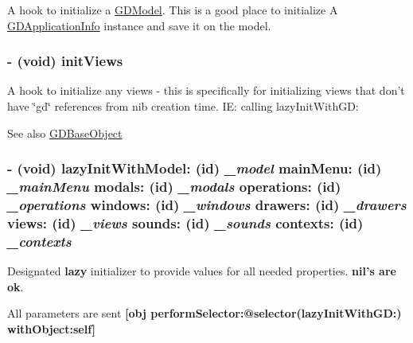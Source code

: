 A hook to initialize a \hyperlink{interface_g_d_model}{GDModel}. This is a good place to initialize A \hyperlink{interface_g_d_application_info}{GDApplicationInfo} instance and save it on the model. \hypertarget{interface_g_d_document_a9df189df6fe07e6e928157b669741e5b}{
\subsubsection[{initViews}]{\setlength{\rightskip}{0pt plus 5cm}-\/ (void) initViews }}
\label{interface_g_d_document_a9df189df6fe07e6e928157b669741e5b}


A hook to initialize any views -\/ this is specifically for initializing views that don't have \char`\"{}gd\char`\"{} references from nib creation time. IE: calling lazyInitWithGD:

\begin{DoxySeeAlso}{See also}
\hyperlink{interface_g_d_base_object}{GDBaseObject} 
\end{DoxySeeAlso}
\hypertarget{interface_g_d_document_a5d6d2016ec8205c51c122f0ac5de4797}{
\subsubsection[{lazyInitWithModel:mainMenu:modals:operations:windows:drawers:views:sounds:contexts:}]{\setlength{\rightskip}{0pt plus 5cm}-\/ (void) lazyInitWithModel: (id) {\em \_\-model}\/ mainMenu: (id) {\em \_\-mainMenu}\/ modals: (id) {\em \_\-modals}\/ operations: (id) {\em \_\-operations}\/ windows: (id) {\em \_\-windows}\/ drawers: (id) {\em \_\-drawers}\/ views: (id) {\em \_\-views}\/ sounds: (id) {\em \_\-sounds}\/ contexts: (id) {\em \_\-contexts}}}
\label{interface_g_d_document_a5d6d2016ec8205c51c122f0ac5de4797}


Designated {\bfseries lazy} initializer to provide values for all needed properties. {\bfseries nil's are ok}.

All parameters are sent {\bfseries \mbox{[}obj performSelector:@selector(lazyInitWithGD:) withObject:self\mbox{]}}

